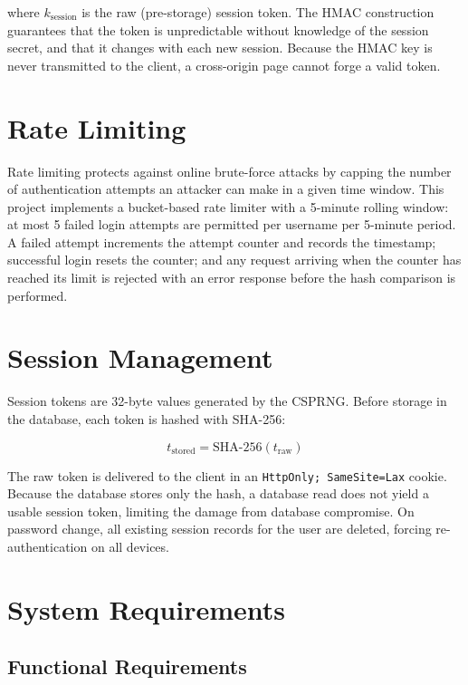 \noindent where $k_{\text{session}}$ is the raw (pre-storage) session token. The HMAC construction guarantees that the token is unpredictable without knowledge of the session secret, and that it changes with each new session. Because the HMAC key is never transmitted to the client, a cross-origin page cannot forge a valid token.

\section{Rate Limiting}
\label{sec:theory_rate}

Rate limiting protects against online brute-force attacks by capping the number of authentication attempts an attacker can make in a given time window. This project implements a bucket-based rate limiter with a 5-minute rolling window: at most 5 failed login attempts are permitted per username per 5-minute period. A failed attempt increments the attempt counter and records the timestamp; successful login resets the counter; and any request arriving when the counter has reached its limit is rejected with an error response before the hash comparison is performed.

\section{Session Management}
\label{sec:theory_sessions}

Session tokens are 32-byte values generated by the CSPRNG. Before storage in the database, each token is hashed with SHA-256:

\begin{equation}
  t_{\text{stored}} = \mathrm{SHA\text{-}256}(t_{\text{raw}})
  \label{eq:session_hash}
\end{equation}

\noindent The raw token is delivered to the client in an \texttt{HttpOnly; SameSite=Lax} cookie. Because the database stores only the hash, a database read does not yield a usable session token, limiting the damage from database compromise. On password change, all existing session records for the user are deleted, forcing re-authentication on all devices.

\section{System Requirements}
\label{sec:theory_requirements}

\subsection{Functional Requirements}
\label{sec:theory_func_req}

